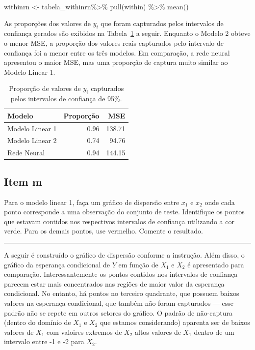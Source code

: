 \documentclass[
  a4paperpaper,
]{article}
\newenvironment{Shaded}{\begin{snugshade}}{\end{snugshade}}
\newcommand{\FunctionTok}[1]{\textcolor[rgb]{0.28,0.35,0.67}{#1}}
\newcommand{\NormalTok}[1]{\textcolor[rgb]{0.00,0.23,0.31}{#1}}
\newcommand{\OtherTok}[1]{\textcolor[rgb]{0.00,0.23,0.31}{#1}}
\newcommand{\SpecialCharTok}[1]{\textcolor[rgb]{0.37,0.37,0.37}{#1}}
\begin{document}
\begin{Shaded}
\begin{Highlighting}[]
\NormalTok{withinrn }\OtherTok{\textless{}{-}}\NormalTok{ tabela\_withinrn}\SpecialCharTok{\%\textgreater{}\%}
  \FunctionTok{pull}\NormalTok{(within) }\SpecialCharTok{\%\textgreater{}\%}
  \FunctionTok{mean}\NormalTok{()}
\end{Highlighting}
\end{Shaded}

As proporções dos valores de \(y_i\) que foram capturados pelos
intervalos de confiança gerados são exibidos na
Tabela~\ref{tbl-intervalos-confianca} a seguir. Enquanto o Modelo 2
obteve o menor MSE, a proporção dos valores reais capturados pelo
intervalo de confiança foi a menor entre os três modelos. Em comparação,
a rede neural apresentou o maior MSE, mas uma proporção de captura muito
similar ao Modelo Linear 1.

\begin{longtable}[]{@{}lrr@{}}

\caption{\label{tbl-intervalos-confianca}Proporção de valores de \(y_i\)
capturados pelos intervalos de confiança de 95\%.}

\tabularnewline

\toprule\noalign{}
Modelo & Proporção & MSE \\
\midrule\noalign{}
\endhead
\bottomrule\noalign{}
\endlastfoot
Modelo Linear 1 & 0.96 & 138.71 \\
Modelo Linear 2 & 0.74 & 94.76 \\
Rede Neural & 0.94 & 144.15 \\

\end{longtable}

\subsection{Item m}\label{item-m}

Para o modelo linear 1, faça um gráfico de dispersão entre \(x_1\) e
\(x_2\) onde cada ponto corresponde a uma observação do conjunto de
teste. Identifique os pontos que estavam contidos nos respectivos
intervalos de confiança utilizando a cor verde. Para os demais pontos,
use vermelho. Comente o resultado.

\begin{center}\rule{0.5\linewidth}{0.5pt}\end{center}

A seguir é construído o gráfico de dispersão conforme a instrução. Além
disso, o gráfico da esperança condicional de \(Y\) em função de \(X_1\)
e \(X_2\) é apresentado para comparação. Interessantemente os pontos
contidos nos intervalos de confiança parecem estar mais concentrados nas
regiões de maior valor da esperança condicional. No entanto, há pontos
no terceiro quadrante, que possuem baixos valores na esperança
condicional, que também não foram capturados --- esse padrão não se
repete em outros setores do gráfico. O padrão de não-captura (dentro do
domínio de \(X_1\) e \(X_2\) que estamos considerando) aparenta ser de
baixos valores de \(X_1\) com valoires extremos de \(X_2\) altos valores
de \(X_1\) dentro de um intervalo entre -1 e -2 para \(X_2\).
\end{document}
